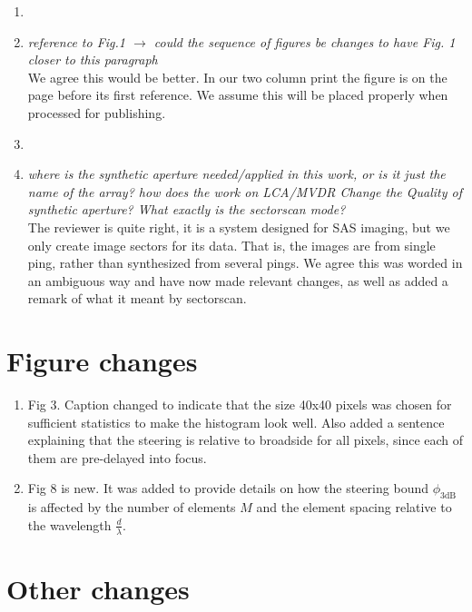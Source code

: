 \documentclass[11pt]{article} %
\newcommand\1{\vec 1}
\newcommand\q[1]{\textit{#1}}
\newcommand\qi[1]{\item\q{#1}}
\newcommand\hi[1]{\item[\textbf{#1}]}
\newcommand\ans[1]{#1}
\newcommand\ai[1]{\\[.5\baselineskip]\ans{#1}}
\begin{document}
\begin{enumerate}
%
\hi{Page 8}
\qi{reference to Fig.1 $\rightarrow$ could the sequence of figures be changes to have Fig. 1 closer to this paragraph}
\ai{We agree this would be better. In our two column print the figure is on the page before its first reference. We assume this will be placed properly when processed for publishing.}
%
\hi{Page 11}
\qi{where is the synthetic aperture needed/applied in this work, or is it just the name of the array? how does the work on LCA/MVDR Change the Quality of synthetic aperture? What exactly is the sectorscan mode?}
\ai{The reviewer is quite right, it is a system designed for SAS imaging, but we only create image sectors for its data. That is, the images are from single ping, rather than synthesized from several pings. We agree this was worded in an ambiguous way and have now made relevant changes, as well as added a remark of what it meant by sectorscan.}
%
\end{enumerate}


\newpage

\section{Figure changes}

\begin{enumerate}
\item Fig 3. Caption changed to indicate that the size 40x40 pixels was chosen for sufficient statistics to make the histogram look well. Also added a sentence explaining that the steering is relative to broadside for all pixels, since each of them are pre-delayed into focus.
\item Fig 8 is new. It was added to provide details on how the steering bound $\phi_\mathrm{3dB}$ is affected by the number of elements $M$ and the element spacing relative to the wavelength $\frac{d}{\lambda}$.
\end{enumerate}


\section{Other changes}
\end{document}
